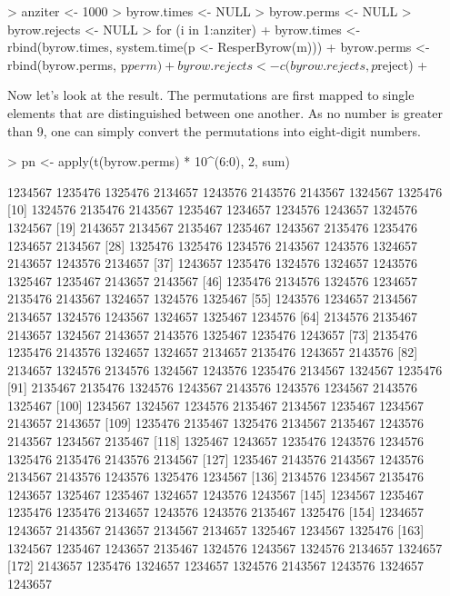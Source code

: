 \documentclass{scrartcl}
\begin{document}
\begin{Schunk}
\begin{Sinput}
> anziter <- 1000
> byrow.times <- NULL
> byrow.perms <- NULL
> byrow.rejects <- NULL
> for (i in 1:anziter) {
+     byrow.times <- rbind(byrow.times, system.time(p <- ResperByrow(m)))
+     byrow.perms <- rbind(byrow.perms, p$perm)
+     byrow.rejects <- c(byrow.rejects, p$reject)
+ }
\end{Sinput}
\end{Schunk}

Now let's look at the result. The permutations are first mapped to single elements that are distinguished between one another. As no number is greater than 9, one can simply convert the permutations into eight-digit numbers.

\begin{Schunk}
\begin{Sinput}
> pn <- apply(t(byrow.perms) * 10^(6:0), 2, sum)
\end{Sinput}
\begin{Soutput}
   [1] 1234567 1235476 1325476 2134657 1243576 2143576 2143567 1324567 1325476
  [10] 1324576 2135476 2143567 1235467 1234657 1234576 1243657 1324576 1324567
  [19] 2143657 2134567 2135467 1235467 1243567 2135476 1235476 1234657 2134567
  [28] 1325476 1325476 1234576 2143567 1243576 1324657 2143657 1243576 2134657
  [37] 1243657 1235476 1324576 1324657 1243576 1325467 1235467 2143657 2143567
  [46] 1235476 2134576 1324576 1234657 2135476 2143567 1324657 1324576 1325467
  [55] 1243576 1234657 2134567 2134657 1324576 1243567 1324657 1325467 1234576
  [64] 2134576 2135467 2143657 1324567 2143657 2143576 1325467 1235476 1243657
  [73] 2135476 1235476 2143576 1324657 1324657 2134657 2135476 1243657 2143576
  [82] 2134657 1324576 2134576 1324567 1243576 1235476 2134567 1324567 1235476
  [91] 2135467 2135476 1324576 1243567 2143576 1243576 1234567 2143576 1325467
 [100] 1234567 1324567 1234576 2135467 2134567 1235467 1234567 2143657 2143657
 [109] 1235476 2135467 1325476 2134567 2135467 1243576 2143567 1234567 2135467
 [118] 1325467 1243657 1235476 1243576 1234576 1325476 2135476 2143576 2134567
 [127] 1235467 2143576 2143567 1243576 2134567 2143576 1243576 1325476 1234567
 [136] 2134576 1234567 2135476 1243657 1325467 1235467 1324657 1243576 1243567
 [145] 1234567 1235467 1235476 1235476 2134657 1243576 1243576 2135467 1325476
 [154] 1234657 1243657 2143567 2143657 2134567 2134657 1325467 1234567 1325476
 [163] 1324567 1235467 1243657 2135467 1324576 1243567 1324576 2134657 1324657
 [172] 2143657 1235476 1324657 1234657 1324576 2143567 1243576 1324657 1243657

\end{Soutput}
\end{Schunk}
\end{document}

